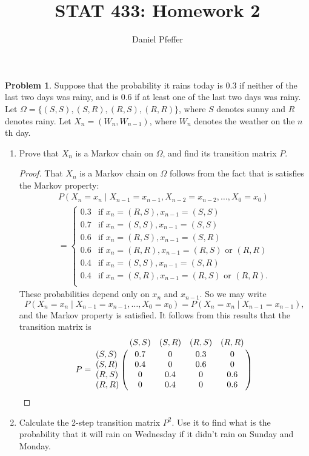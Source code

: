 \documentclass[oneside,reqno]{amsart}
\title{STAT 433: Homework 2}
\author{Daniel Pfeffer}
\theoremstyle{definition}
\newtheorem{prob}{Problem}
\begin{document}
\maketitle


\begin{prob}
Suppose that the probability it rains today is 0.3 if neither of the last two days was rainy, and is 0.6 if at least one of the last two days was rainy. Let $\Omega = \{(S,S), (S,R), (R,S), (R,R)\}$, where $S$ denotes sunny and $R$ denotes rainy. Let $X_n = (W_n, W_{n-1})$, where $W_n$ denotes the weather on the $n$th day.
\end{prob}


\begin{enumerate}
\item
Prove that $X_n$ is a Markov chain on $\Omega$, and find its transition matrix $P$.
\begin{proof}
That $X_n$ is a Markov chain on $\Omega$ follows from the fact that is satisfies the Markov property:
\begin{align*}
	P(X_n = x_n \mid X_{n-1} = x_{n-1}, X_{n-2} = x_{n-2}, \dotsc, X_0 = x_0) \\
	= \begin{cases}
		0.3 & \text{if } x_n = (R,S), x_{n-1}= (S,S) \\
		0.7 & \text{if } x_n = (S,S), x_{n-1}= (S,S) \\
		0.6 & \text{if } x_n = (R,S), x_{n-1}= (S,R) \\
		0.6 & \text{if } x_n = (R,R), x_{n-1}= (R,S) \text{ or } (R,R) \\
		0.4 & \text{if } x_n = (S,S), x_{n-1}= (S,R) \\
		0.4 & \text{if } x_n = (S,R), x_{n-1}= (R,S) \text{ or } (R,R). \\
	\end{cases}
\end{align*}
These probabilities depend only on $x_n$ and $x_{n-1}$. So we may write 
\[
	 P(X_n = x_n  \mid X_{n-1} = x_{n-1}, \dotsc, X_0 = x_0) = P(X_n = x_n \mid X_{n-1} = x_{n-1}),
\]
and the Markov property is satisfied. It follows from this results that the transition matrix is 
\[
	P = \bordermatrix{~ & (S,S) & (S,R) & (R,S) &(R,R) \cr 
		(S,S) & 0.7 & 0 & 0.3 & 0 \cr
		(S,R) & 0.4 & 0 & 0.6 & 0 \cr
		(R,S) & 0 & 0.4 & 0 & 0.6 \cr
		(R,R) & 0 & 0.4 & 0 & 0.6 \cr}
\]
\end{proof}
\item
Calculate the 2-step transition matrix $P^2$. Use it to find what is the probability that it will rain on Wednesday if it didn't rain on Sunday and Monday.

\end{enumerate}
\end{document}
